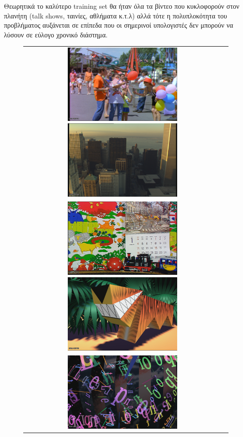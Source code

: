 \indent Θεωρητικά το καλύτερο training set θα ήταν όλα τα βίντεο που κυκλοφορούν στον πλανήτη (talk shows, ταινίες, αθλήματα κ.τ.λ) αλλά τότε η πολυπλοκότητα του προβλήματος αυξάνεται σε επίπεδα που οι σημερινοί υπολογιστές δεν μπορούν να λύσουν σε εύλογο χρονικό διάστημα.

\begin{figure}[p]
\centering
\begin{tabular}{c c}
    \includegraphics[height=4.0cm]{chapter4/frames/src13.png}
    \includegraphics[height=4.0cm]{chapter4/frames/src14.png}\\
    \includegraphics[height=4.0cm]{chapter4/frames/src15.png}
    \includegraphics[height=4.0cm]{chapter4/frames/src16.png}\\
    \includegraphics[height=4.0cm]{chapter4/frames/src17.png}

\end{tabular}
\end{figure}
